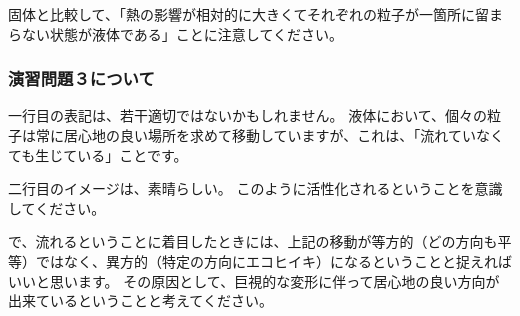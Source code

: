 \documentclass[uplatex,dvipdfmx,a4paper,11pt]{jsreport}
\begin{document}
固体と比較して、「熱の影響が相対的に大きくてそれぞれの粒子が一箇所に留まらない状態が液体である」ことに注意してください。


\subsubsection*{演習問題３について}

一行目の表記は、若干適切ではないかもしれません。
液体において、個々の粒子は常に居心地の良い場所を求めて移動していますが、これは、「流れていなくても生じている」ことです。

二行目のイメージは、素晴らしい。
このように活性化されるということを意識してください。

で、流れるということに着目したときには、上記の移動が等方的（どの方向も平等）ではなく、異方的（特定の方向にエコヒイキ）になるということと捉えればいいと思います。
その原因として、巨視的な変形に伴って居心地の良い方向が出来ているということと考えてください。


\clearpage
\end{document}
